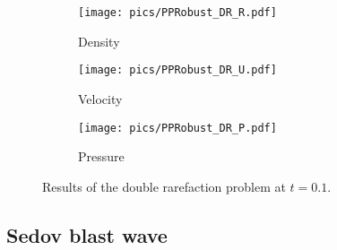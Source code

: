 \begin{figure}[htbp]
    \centering
    \begin{subfigure}{0.33\textwidth}
        \texttt{[image: pics/PPRobust\_DR\_R.pdf]}
        \caption[]{Density}
    \end{subfigure}\hfill
    \begin{subfigure}{0.33\textwidth}
        \texttt{[image: pics/PPRobust\_DR\_U.pdf]}
        \caption[]{Velocity}
    \end{subfigure}\hfill
    \begin{subfigure}{0.33\textwidth}
        \texttt{[image: pics/PPRobust\_DR\_P.pdf]}
        \caption[]{Pressure}
    \end{subfigure}
    \caption{Results of the double rarefaction problem at $t=0.1$.}
    \label{fig:doubleRare}
\end{figure}




\subsection{Sedov blast wave}
\label{ssec:sedov}

